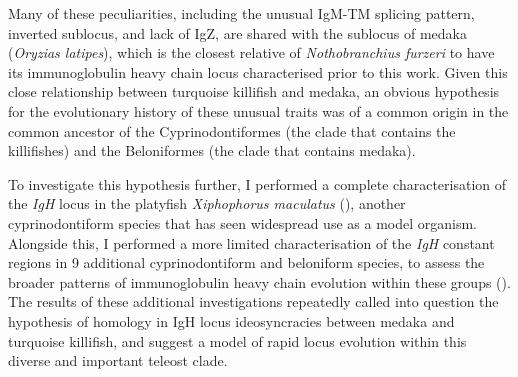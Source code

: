 	Many of these peculiarities, including the unusual IgM-TM splicing pattern, inverted sublocus, and lack of IgZ, are shared with the sublocus of medaka (\textit{Oryzias latipes}), which is the closest relative of \textit{Nothobranchius furzeri} to have its immunoglobulin heavy chain locus characterised prior to this work. Given this close relationship between turquoise killifish and medaka, an obvious hypothesis for the evolutionary history of these unusual traits was of a common origin in the common ancestor of the Cyprinodontiformes (the clade that contains the killifishes) and the Beloniformes (the clade that contains medaka). %

	To investigate this hypothesis further, I performed a complete characterisation of the \textit{IgH} locus in the platyfish \textit{Xiphophorus maculatus} (), another cyprinodontiform species that has seen widespread use as a model organism. Alongside this, I performed a more limited characterisation of the \textit{IgH} constant regions in 9 %
	additional cyprinodontiform and beloniform species, to assess the broader patterns of immunoglobulin heavy chain evolution within these groups (). The results of these additional investigations repeatedly called into question the hypothesis of homology in IgH locus ideosyncracies between medaka and turquoise killifish, and suggest a model of rapid locus evolution within this diverse and important teleost clade.
	
%
%



